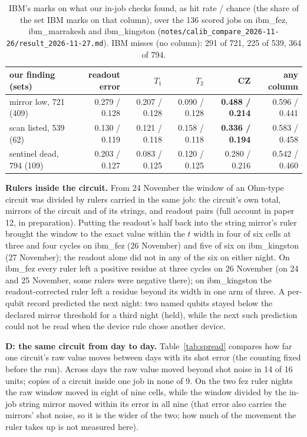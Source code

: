 \documentclass[10pt,a4paper]{article}
\begin{document}
\begin{table}[H]\centering\footnotesize
\begin{tabular}{lrrrrr}
\toprule
our finding (sets) & readout error & $T_1$ & $T_2$ & CZ & any column \\
\midrule
mirror low, 721 (409) & 0.279 / 0.128 & 0.207 / 0.128 & 0.090 / 0.128 & \textbf{0.488 / 0.214} & 0.596 / 0.441 \\
scan listed, 539 (62) & 0.130 / 0.119 & 0.121 / 0.118 & 0.158 / 0.118 & \textbf{0.336 / 0.194} & 0.583 / 0.458 \\
sentinel dead, 794 (109) & 0.203 / 0.127 & 0.083 / 0.125 & 0.120 / 0.125 & 0.280 / 0.216 & 0.542 / 0.460 \\
\bottomrule
\end{tabular}
\caption{IBM's marks on what our in-job checks found, as hit rate / chance (the share of the set IBM marks on that
column), over the 136 scored jobs on ibm\_fez, ibm\_marrakesh and ibm\_kingston (\texttt{notes/calib\_compare\_2026-11-26/result\_2026-11-27.md}).
IBM misses (no column): 291 of 721, 225 of 539, 364 of 794.}\label{tab:calib}
\end{table}

\textbf{Rulers inside the circuit.} From 24 November the window of an Ohm-type circuit was divided by rulers carried in
the same job: the circuit's own total, mirrors of the circuit and of its strings, and readout pairs (full account in
paper 12, in preparation). Putting the readout's half back into the string mirror's ruler brought the window to the
exact value within the $t$ width in four of six cells at three and four cycles on ibm\_fez (26 November) and five of six
on ibm\_kingston (27 November); the readout alone did not in any of the six on either night. On ibm\_fez every ruler
left a positive residue at three cycles on 26 November (on 24 and 25 November, some rulers were negative there); on ibm\_kingston the readout-corrected ruler left a residue beyond
its width in one arm of three. A per-qubit record predicted the next night: two named qubits stayed below the declared mirror threshold for a
third night (held), while the next such prediction could not be read when the device rule chose another device.

\textbf{D: the same circuit from day to day.} Table~\ref{tab:spread} compares how far one circuit's raw value moves
between days with its shot error (the counting fixed before the run). Across days the raw value moved beyond shot
noise in 14 of 16 units; copies of a circuit inside one job in none of 9. On the two fez ruler nights the raw window
moved in eight of nine cells, while the window divided by the in-job string mirror moved within its error in all nine
(that error also carries the mirrors' shot noise, so it is the wider of the two; how much of the movement the ruler
takes up is not measured here).
\end{document}
